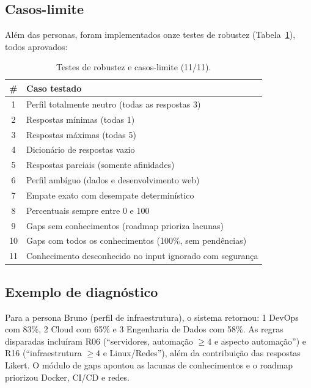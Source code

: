 \documentclass[12pt,a4paper]{article}
\begin{document}
\subsection{Casos-limite}

Al\'em das personas, foram implementados onze testes de robustez
(Tabela~\ref{tab:edge}), todos aprovados:

\begin{table}[htbp]
\centering
\caption{Testes de robustez e casos-limite (11/11).}
\label{tab:edge}
\footnotesize
\begin{tabular}{@{}cl@{}}
\toprule
\# & Caso testado \\
\midrule
1  & Perfil totalmente neutro (todas as respostas 3) \\
2  & Respostas m\'inimas (todas 1) \\
3  & Respostas m\'aximas (todas 5) \\
4  & Dicion\'ario de respostas vazio \\
5  & Respostas parciais (somente afinidades) \\
6  & Perfil amb\'iguo (dados e desenvolvimento web) \\
7  & Empate exato com desempate determin\'istico \\
8  & Percentuais sempre entre 0 e 100 \\
9  & Gaps sem conhecimentos (roadmap prioriza lacunas) \\
10 & Gaps com todos os conhecimentos (100\%, sem pend\^encias) \\
11 & Conhecimento desconhecido no input ignorado com seguran\c{c}a \\
\bottomrule
\end{tabular}
\end{table}

\subsection{Exemplo de diagn\'ostico}

Para a persona Bruno (perfil de infraestrutura), o sistema retornou:
1\textordmasculine{} DevOps com 83\%, 2\textordmasculine{} Cloud com 65\% e
3\textordmasculine{} Engenharia de Dados com 58\%. As regras disparadas inclu\'iram
R06 (``servidores, automa\c{c}\~ao $\geq 4$ e aspecto automa\c{c}\~ao'') e R16
(``infraestrutura $\geq 4$ e Linux/Redes''), al\'em da contribui\c{c}\~ao das
respostas Likert. O m\'odulo de gaps apontou as lacunas de conhecimentos e o
roadmap priorizou Docker, CI/CD e redes.
\end{document}

